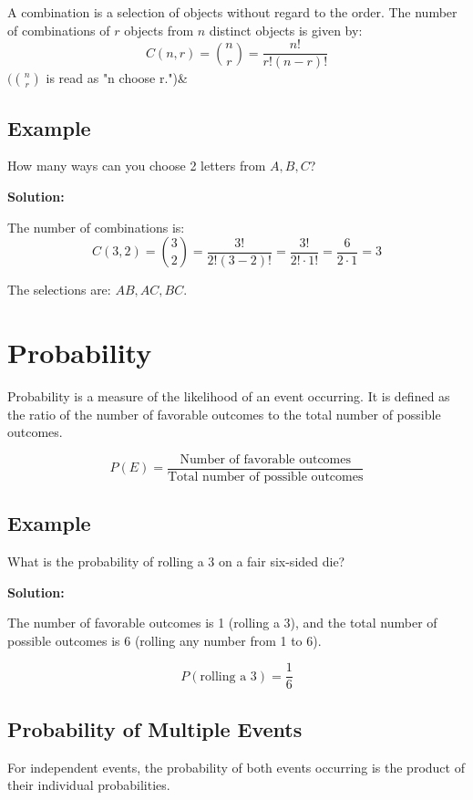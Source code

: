 \documentclass[12pt]{article}
\begin{document}
A combination is a selection of objects without regard to the order. The number of combinations of \( r \) objects from \( n \) distinct objects is given by:
\[C(n, r) = \binom{n}{r} = \frac{n!}{r!(n-r)!}\]
$(\binom{n}{r}$\textrm{ is read as "n choose r.")}&

\subsection*{Example}

How many ways can you choose 2 letters from \( A, B, C \)?

\textbf{Solution:}

The number of combinations is:
\[C(3, 2) = \binom{3}{2} = \frac{3!}{2!(3-2)!} = \frac{3!}{2! \cdot 1!} = \frac{6}{2 \cdot 1} = 3\]

The selections are: \( AB, AC, BC \).

\newpage

\section*{Probability}

Probability is a measure of the likelihood of an event occurring. It is defined as the ratio of the number of favorable outcomes to the total number of possible outcomes.

\[
P(E) = \frac{\text{Number of favorable outcomes}}{\text{Total number of possible outcomes}}
\]

\subsection*{Example}

What is the probability of rolling a 3 on a fair six-sided die?

\textbf{Solution:}

The number of favorable outcomes is 1 (rolling a 3), and the total number of possible outcomes is 6 (rolling any number from 1 to 6).

\[P(\text{rolling a 3}) = \frac{1}{6}\]

\subsection*{Probability of Multiple Events}

For independent events, the probability of both events occurring is the product of their individual probabilities.
\end{document}
